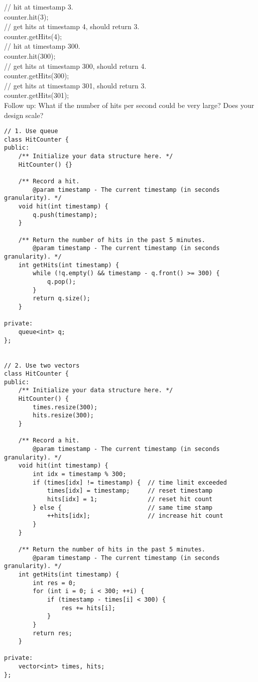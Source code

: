 // hit at timestamp 3.\\
counter.hit(3);\\

// get hits at timestamp 4, should return 3.\\
counter.getHits(4);\\

// hit at timestamp 300.\\
counter.hit(300);\\

// get hits at timestamp 300, should return 4.\\
counter.getHits(300);\\

// get hits at timestamp 301, should return 3.\\
counter.getHits(301); \\

Follow up: What if the number of hits per second could be very large? Does your design scale? \\

\begin{lstlisting}
// 1. Use queue
class HitCounter {
public:
    /** Initialize your data structure here. */
    HitCounter() {}
    
    /** Record a hit.
        @param timestamp - The current timestamp (in seconds granularity). */
    void hit(int timestamp) {
        q.push(timestamp);
    }
    
    /** Return the number of hits in the past 5 minutes.
        @param timestamp - The current timestamp (in seconds granularity). */
    int getHits(int timestamp) {
        while (!q.empty() && timestamp - q.front() >= 300) {
            q.pop();
        }
        return q.size();
    }

private:
    queue<int> q;
};


// 2. Use two vectors
class HitCounter {
public:
    /** Initialize your data structure here. */
    HitCounter() {
        times.resize(300); 
        hits.resize(300);
    }
    
    /** Record a hit.
        @param timestamp - The current timestamp (in seconds granularity). */
    void hit(int timestamp) {
        int idx = timestamp % 300;
        if (times[idx] != timestamp) {  // time limit exceeded
            times[idx] = timestamp;     // reset timestamp
            hits[idx] = 1;              // reset hit count
        } else {                        // same time stamp
            ++hits[idx];                // increase hit count
        }
    }
    
    /** Return the number of hits in the past 5 minutes.
        @param timestamp - The current timestamp (in seconds granularity). */
    int getHits(int timestamp) {
        int res = 0;
        for (int i = 0; i < 300; ++i) {
            if (timestamp - times[i] < 300) {
                res += hits[i];
            }
        }
        return res;
    }

private:
    vector<int> times, hits;
};
\end{lstlisting}


